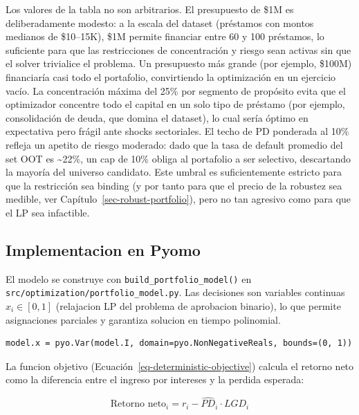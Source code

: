 \documentclass[
  spanish,
  11pt,
  letterpaper,
]{scrbook}
\theoremstyle{plain}
\theoremstyle{remark}
\begin{document}
Los valores de la tabla no son arbitrarios. El presupuesto de \$1M es
deliberadamente modesto: a la escala del dataset (préstamos con montos
medianos de \$10--15K), \$1M permite financiar entre 60 y 100 préstamos,
lo suficiente para que las restricciones de concentración y riesgo sean
activas sin que el solver trivialice el problema. Un presupuesto más
grande (por ejemplo, \$100M) financiaría casi todo el portafolio,
convirtiendo la optimización en un ejercicio vacío. La concentración
máxima del 25\% por segmento de propósito evita que el optimizador
concentre todo el capital en un solo tipo de préstamo (por ejemplo,
consolidación de deuda, que domina el dataset), lo cual sería óptimo en
expectativa pero frágil ante shocks sectoriales. El techo de PD
ponderada al 10\% refleja un apetito de riesgo moderado: dado que la
tasa de default promedio del set OOT es \textasciitilde22\%, un cap de
10\% obliga al portafolio a ser selectivo, descartando la mayoría del
universo candidato. Este umbral es suficientemente estricto para que la
restricción sea binding (y por tanto para que el precio de la robustez
sea medible, ver Capítulo~\ref{sec-robust-portfolio}), pero no tan
agresivo como para que el LP sea infactible.

\subsection{Implementacion en Pyomo}\label{implementacion-en-pyomo}

El modelo se construye con \texttt{build\_portfolio\_model()} en
\texttt{src/optimization/portfolio\_model.py}. Las decisiones son
variables continuas \(x_i \in [0, 1]\) (relajacion LP del problema de
aprobacion binario), lo que permite asignaciones parciales y garantiza
solucion en tiempo polinomial.

\begin{verbatim}
model.x = pyo.Var(model.I, domain=pyo.NonNegativeReals, bounds=(0, 1))
\end{verbatim}

La funcion objetivo (Ecuación~\ref{eq-deterministic-objective}) calcula
el retorno neto como la diferencia entre el ingreso por intereses y la
perdida esperada:

\[
\text{Retorno neto}_i = r_i - \widehat{PD}_i \cdot LGD_i
\]
\end{document}

